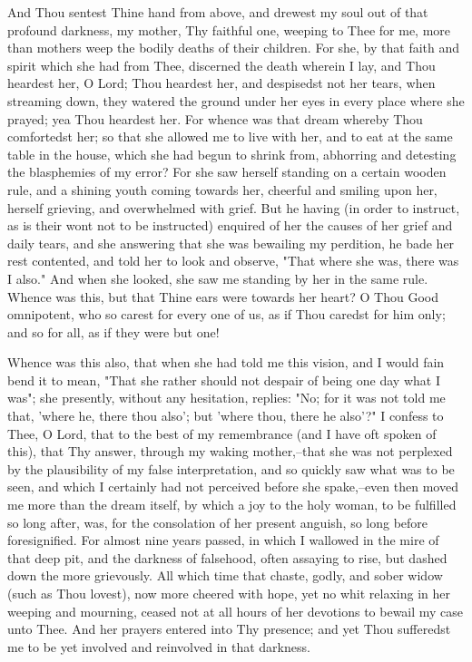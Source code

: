\documentclass[b5paper,openright,12pt,twoside]{book}
\begin{document}
And Thou sentest Thine hand from above, and drewest my soul out of that
profound darkness, my mother, Thy faithful one, weeping to Thee for me,
more than mothers weep the bodily deaths of their children. For she,
by that faith and spirit which she had from Thee, discerned the death
wherein I lay, and Thou heardest her, O Lord; Thou heardest her, and
despisedst not her tears, when streaming down, they watered the ground
under her eyes in every place where she prayed; yea Thou heardest her.
For whence was that dream whereby Thou comfortedst her; so that she
allowed me to live with her, and to eat at the same table in the
house, which she had begun to shrink from, abhorring and detesting
the blasphemies of my error? For she saw herself standing on a certain
wooden rule, and a shining youth coming towards her, cheerful and
smiling upon her, herself grieving, and overwhelmed with grief. But he
having (in order to instruct, as is their wont not to be instructed)
enquired of her the causes of her grief and daily tears, and she
answering that she was bewailing my perdition, he bade her rest
contented, and told her to look and observe, "That where she was, there
was I also." And when she looked, she saw me standing by her in the same
rule. Whence was this, but that Thine ears were towards her heart? O
Thou Good omnipotent, who so carest for every one of us, as if Thou
caredst for him only; and so for all, as if they were but one!

Whence was this also, that when she had told me this vision, and I would
fain bend it to mean, "That she rather should not despair of being one
day what I was"; she presently, without any hesitation, replies: "No;
for it was not told me that, 'where he, there thou also'; but 'where
thou, there he also'?" I confess to Thee, O Lord, that to the best of my
remembrance (and I have oft spoken of this), that Thy answer, through
my waking mother,--that she was not perplexed by the plausibility of my
false interpretation, and so quickly saw what was to be seen, and which
I certainly had not perceived before she spake,--even then moved me more
than the dream itself, by which a joy to the holy woman, to be fulfilled
so long after, was, for the consolation of her present anguish, so long
before foresignified. For almost nine years passed, in which I wallowed
in the mire of that deep pit, and the darkness of falsehood, often
assaying to rise, but dashed down the more grievously. All which time
that chaste, godly, and sober widow (such as Thou lovest), now more
cheered with hope, yet no whit relaxing in her weeping and mourning,
ceased not at all hours of her devotions to bewail my case unto Thee.
And her prayers entered into Thy presence; and yet Thou sufferedst me to
be yet involved and reinvolved in that darkness.
\end{document}
